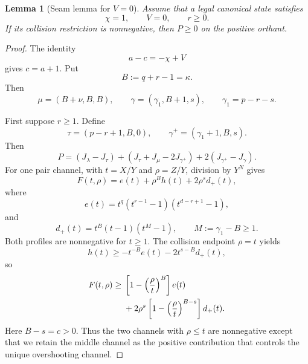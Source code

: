 \documentclass[11pt]{article}
\newtheorem{lemma}[theorem]{Lemma}
\theoremstyle{definition}
\begin{document}
\begin{lemma}[Seam lemma for \(V=0\)]
\label{lem:phase-independent-v0-seam}
Assume that a legal canonical state satisfies
\begin{equation*}
\chi=1,
\qquad
V=0,
\qquad
r\ge0.
\end{equation*}
If its collision restriction is nonnegative, then \(P\ge0\) on the positive orthant.
\end{lemma}

\begin{proof}
The identity
\begin{equation*}
a-c=-\chi+V
\end{equation*}
gives \(c=a+1\).  Put
\begin{equation*}
B:=q+r-1=\kappa.
\end{equation*}
Then
\begin{equation*}
\mu=(B+\nu,B,B),
\qquad
\gamma=(\gamma_1,B+1,s),
\qquad
\gamma_1=p-r-s.
\end{equation*}

First suppose \(r\ge1\).  Define
\begin{equation*}
\tau=(p-r+1,B,0),
\qquad
\gamma^+=(\gamma_1+1,B,s).
\end{equation*}
Then
\begin{equation}\label{eq:phase-independent-v0-decomposition}
P
=(J_\lambda-J_\tau)
 +(J_\tau+J_\mu-2J_{\gamma^+})
 +2(J_{\gamma^+}-J_\gamma).
\end{equation}
For one pair channel, with \(t=X/Y\) and \(\rho=Z/Y\), division by \(Y^N\) gives
\begin{equation}\label{eq:phase-independent-v0-channel}
F(t,\rho)
=e(t)+\rho^B h(t)+2\rho^s d_+(t),
\end{equation}
where
\begin{equation*}
e(t)=t^q(t^{r-1}-1)(t^{d-r+1}-1),
\end{equation*}
and
\begin{equation*}
d_+(t)=t^B(t-1)(t^M-1),
\qquad
M:=\gamma_1-B\ge1.
\end{equation*}
Both profiles are nonnegative for \(t\ge1\).  The collision endpoint \(\rho=t\) yields
\begin{equation*}
h(t)
\ge
-t^{-B}e(t)-2t^{s-B}d_+(t),
\end{equation*}
so
\begin{align}\label{eq:phase-independent-v0-bound}
F(t,\rho)\ge{}&
\left[1-\left(\frac{\rho}{t}\right)^B\right]e(t)\notag\\
&+2\rho^s
\left[1-\left(\frac{\rho}{t}\right)^{B-s}\right]d_+(t).
\end{align}
Here \(B-s=c>0\).  Thus the two channels with \(\rho\le t\) are nonnegative except that we retain the middle channel as the positive contribution that controls the unique overshooting channel.


\end{proof}
\end{document}
